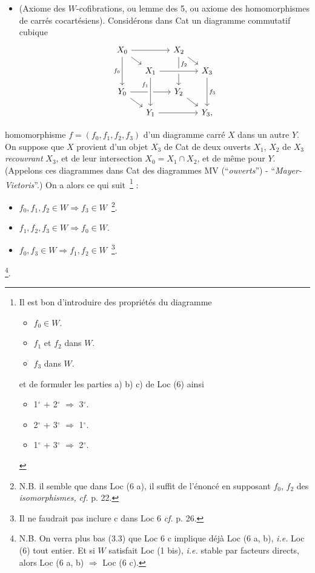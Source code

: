 \documentclass[11pt]{article}
\begin{document}
\begin{itemize}[leftmargin=5em,labelwidth=4em,align=left]
\item[\textbf{Loc 6}] (Axiome des $W$-cofibrations, ou lemme des 5, ou axiome des homomorphismes de carrés cocartésiens). Considérons dans Cat un diagramme commutatif cubique
\[
\begin{tikzcd}[row sep=small,column sep=small]
X_0 \arrow[rr] \arrow[dr] \arrow[dd,"f_0"'] & & X_2 \arrow[dr] \arrow[dd,"f_2" near start] & \\
& X_1 \arrow[rr,crossing over] & & X_3 \arrow[dd,"f_3"] \\
Y_0 \arrow[rr] \arrow[dr] & & Y_2 \arrow[dr] & \\
& Y_1 \arrow[rr] \arrow[from=uu,crossing over,"f_1"' near start] & & Y_3,
\end{tikzcd}
\]
\end{itemize}
homomorphisme $f=(f_0,f_1,f_2,f_3)$ d'un diagramme carré $X$ dans un autre $Y$. On suppose que $X$ provient d'un objet $X_3$ de Cat de deux ouverts $X_1$, $X_2$ de $X_3$ \textit{recouvrant} $X_3$, et de leur intersection $X_0=X_1\cap X_2$, et de même pour $Y$. (Appelons ces diagrammes dans Cat des diagrammes MV (“\textit{ouverts}”) - “\textit{Mayer-Vietoris}”.) On a alors ce qui suit~\footnote[9]{Il est bon d'introduire des propriétés du diagramme
\begin{itemize}[leftmargin=3em,labelwidth=2.5em,align=right]
\item[1$^{\circ}$)] $f_0\in W$.
\item[2$^{\circ}$)] $f_1$ et $f_2$ dans $W$.
\item[3$^{\circ}$)] $f_3$ dans $W$.
\end{itemize}
et de formuler les parties a) b) c) de Loc (6) ainsi
\begin{itemize}[leftmargin=3em,labelwidth=2.5em,align=right]
\item[a)] 1$^{\circ}$ + 2$^{\circ}$ $\Longrightarrow$ 3$^{\circ}$.
\item[b)] 2$^{\circ}$ + 3$^{\circ}$ $\Longrightarrow$ 1$^{\circ}$.
\item[c)] 1$^{\circ}$ + 3$^{\circ}$ $\Longrightarrow$ 2$^{\circ}$.
\end{itemize}} :
\begin{itemize}[leftmargin=3em,labelwidth=2.5em,align=right]
\item[a)] $f_0,f_1,f_2\in W\Longrightarrow f_3\in W$~\footnote[10]{N.B. il semble que dans Loc (6 a), il suffit de l'énoncé en supposant $f_0$, $f_2$ des \textit{isomorphismes,} \textit{cf.} p. 22.}.
\item[b)] $f_1,f_2,f_3\in W\Longrightarrow f_0\in W$.
\item[c)] $f_0,f_3\in W\Longrightarrow f_1,f_2\in W$~\footnote[11]{Il ne faudrait pas inclure c dans Loc 6 \textit{cf.} p. 26.}.
\end{itemize}
\noindent\footnote[12]{N.B. On verra plus bas (3.3) que Loc 6 c implique déjà Loc (6 a, b), \textit{i.e.} Loc (6) tout entier. Et si $W$ satisfait Loc (1 bis), \textit{i.e.} stable par facteurs directs, alors Loc (6 a, b) $\Longrightarrow$ Loc (6 c).}.
\end{document}
